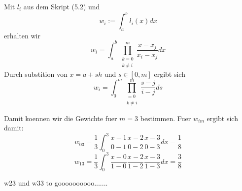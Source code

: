 \documentclass[a4paper,12pt]{article}
\begin{document}
Mit $l_i$ aus dem Skript (5.2) und
\[ w_i := \int_a^b l_i(x) dx \]
erhalten wir
\[ w_i = \int_a^b \prod\limits_{\substack{k=0 \\ k\neq i}}^m \frac{x-x_j}{x_i-x_j} dx \]
Durch substition von $x = a + sh$ und $s \in [0,m]$ ergibt sich
\[ w_i = \int_0^m \prod\limits_{\substack{=0 \\ k\neq i}}^m \frac{s-j}{i-j} ds \]

Damit koennen wir die Gewichte fuer $m = 3$ bestimmen. Fuer $w_{im}$ ergibt sich damit:
\[ w_{03} = \frac{1}{3} \int_0^3 \frac{x-1}{0-1} \frac{x-2}{0-2} \frac{x-3}{0-3} dx = \frac{1}{8} \]
\[ w_{13} = \frac{1}{3} \int_0^3 \frac{x-0}{1-0} \frac{x-2}{1-2} \frac{x-3}{1-3} dx = \frac{3}{8} \]

w23 und w33 to goooooooooo.......
\end{document}
